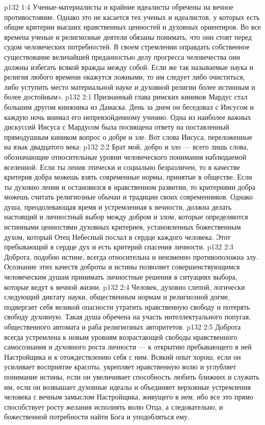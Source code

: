 \vs p132 1:4 Ученые\hyp{}материалисты и крайние идеалисты обречены на вечное противостояние. Однако это не касается тех ученых и идеалистов, у которых есть общие критерии высших нравственных ценностей и духовных ориентиров. Во все времена ученые и религиозные деятели обязаны понимать, что они стоят перед судом человеческих потребностей. В своем стремлении оправдать собственное существование величайшей преданностью делу прогресса человечества они должны избегать всякой вражды между собой. Если же так называемые наука и религия любого времени окажутся ложными, то им следует либо очиститься, либо уступить место материальной науке и духовной религии более истинным и более достойным».
\vs p132 2:1 Признанный глава римских киников Мардус стал большим другом книжника из Дамаска. День за днем он беседовал с Иисусом и каждую ночь внимал его непревзойденному учению. Одна из наиболее важных дискуссий Иисуса с Мардусом была посвящена ответу на поставленный прямодушным киником вопрос о добре и зле. Вот слова Иисуса, переложенные на язык двадцатого века:
\vs p132 2:2 \pc Брат мой, добро и зло --- всего лишь слова, обозначающие относительные уровни человеческого понимания наблюдаемой вселенной. Если ты ленив этически и социально безразличен, то в качестве критерия добра можешь взять современные нормы, принятые в обществе. Если ты духовно ленив и остановился в нравственном развитии, то критериями добра можешь считать религиозные обычаи и традиции своих современников. Однако душа, преодолевающая время и устремленная к вечности, должна делать настоящий и личностный выбор между добром и злом, которые определяются истинными ценностями духовных критериев, установленных божественным духом, который Отец Небесный послал в сердце каждого человека. Этот пребывающий в сердце дух и есть критерий спасения личности.
\vs p132 2:3 Доброта, подобно истине, всегда относительна и неизменно противоположна злу. Осознание этих качеств доброты и истины позволяет совершенствующимся человеческим душам принимать личностные решения в ситуациях выбора, которые ведут к вечной жизни.
\vs p132 2:4 Человек, духовно слепой, логически следующий диктату науки, общественным нормам и религиозной догме, подвергает себя великой опасности утратить нравственную свободу и потерять свободу духовную. Такая душа обречена на участь интеллектуального попугая, общественного автомата и раба религиозных авторитетов.
\vs p132 2:5 Доброта всегда устремлена к новым уровням возрастающей свободы нравственного самосознания и духовного роста личности --- к открытию пребывающего в ней Настройщика и к отождествлению себя с ним. Всякий опыт хорош, если он усиливает восприятие красоты, укрепляет нравственную волю и углубляет понимание истины, если он увеличивает способность любить ближних и служить им, если он возвышает духовные идеалы и объединяет верховные устремления человека с вечным замыслом Настройщика, живущего в нем, ибо все это прямо способствует росту желания исполнять волю Отца, а следовательно, и божественной потребности найти Бога и уподобляться ему.
